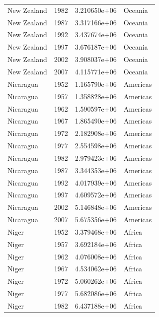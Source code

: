 \documentclass[
  letterpaper,
  DIV=11,
  numbers=noendperiod]{scrreprt}
\begin{document}
\begin{tcolorbox}
\begin{tabular}{lrrl}
New Zealand              &  1982 &  3.210650e+06 &   Oceania \\
New Zealand              &  1987 &  3.317166e+06 &   Oceania \\
New Zealand              &  1992 &  3.437674e+06 &   Oceania \\
New Zealand              &  1997 &  3.676187e+06 &   Oceania \\
New Zealand              &  2002 &  3.908037e+06 &   Oceania \\
New Zealand              &  2007 &  4.115771e+06 &   Oceania \\
Nicaragua                &  1952 &  1.165790e+06 &  Americas \\
Nicaragua                &  1957 &  1.358828e+06 &  Americas \\
Nicaragua                &  1962 &  1.590597e+06 &  Americas \\
Nicaragua                &  1967 &  1.865490e+06 &  Americas \\
Nicaragua                &  1972 &  2.182908e+06 &  Americas \\
Nicaragua                &  1977 &  2.554598e+06 &  Americas \\
Nicaragua                &  1982 &  2.979423e+06 &  Americas \\
Nicaragua                &  1987 &  3.344353e+06 &  Americas \\
Nicaragua                &  1992 &  4.017939e+06 &  Americas \\
Nicaragua                &  1997 &  4.609572e+06 &  Americas \\
Nicaragua                &  2002 &  5.146848e+06 &  Americas \\
Nicaragua                &  2007 &  5.675356e+06 &  Americas \\
Niger                    &  1952 &  3.379468e+06 &    Africa \\
Niger                    &  1957 &  3.692184e+06 &    Africa \\
Niger                    &  1962 &  4.076008e+06 &    Africa \\
Niger                    &  1967 &  4.534062e+06 &    Africa \\
Niger                    &  1972 &  5.060262e+06 &    Africa \\
Niger                    &  1977 &  5.682086e+06 &    Africa \\
Niger                    &  1982 &  6.437188e+06 &    Africa \\

\end{tabular}
\end{tcolorbox}
\end{document}
